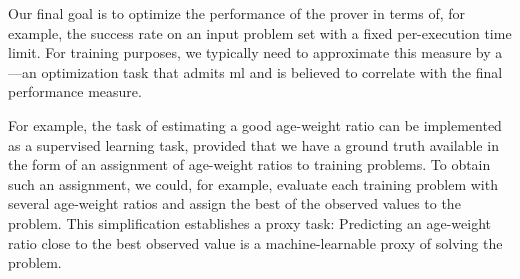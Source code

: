 Our final goal is to optimize the performance of the prover in terms of, for example, the success rate on an input problem set with a fixed per-execution time limit.
For training purposes,
we typically need to approximate this measure by a ---an optimization task that admits \gls{ml} and is believed to correlate with the final performance measure.

For example, the task of estimating a good age-weight ratio can be implemented as a supervised learning task, provided that we have a ground truth available
in the form of an assignment of age-weight ratios to training problems.
To obtain such an assignment, we could, for example, evaluate each training problem with several age-weight ratios and assign the best of the observed values to the problem.
This simplification establishes a proxy task:
Predicting an age-weight ratio close to the best observed value is a machine-learnable proxy of solving the problem.%




